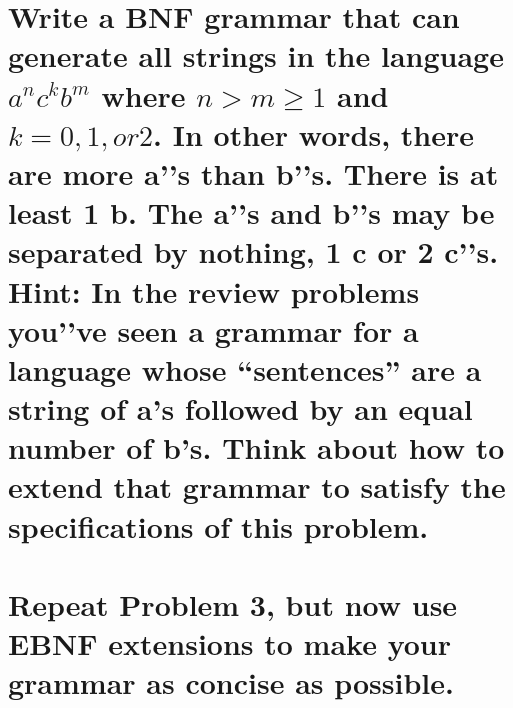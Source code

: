 \documentclass[11pt]{article}
\begin{document}
\section{Write a BNF grammar that can generate all strings in the language $a^{n}c^{k}b^{m}$ where $n > m \geq 1$  and $k = 0,1, or 2$. In
other words, there are more a'’s than b'’s. There is at least 1 b. The a'’s and b'’s may be separated by nothing, 1 c or 2
c'’s. Hint: In the review problems you'’ve seen a grammar for a language whose “sentences” are a string of a's followed
by an equal number of b's. Think about how to extend that grammar to satisfy the specifications of this problem.}
\begin{center} 
\end{center}


\section{Repeat Problem 3, but now use EBNF extensions to make your grammar as concise as possible.}

\begin{center} 
\end{center}
\end{document}

